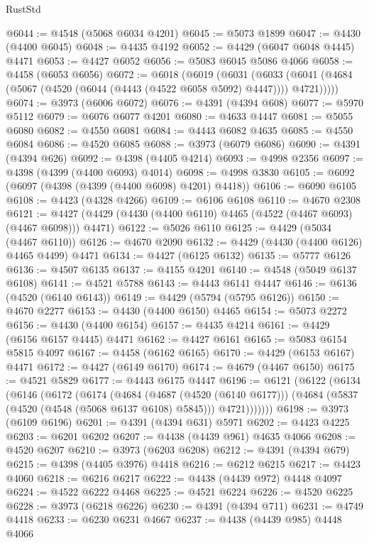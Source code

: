 \begin{lexlean}{RustStd}
\begin{coremodule}
{\begin{coremodule}
{{{{{{{{{{{{{{{{{{{{{{{{{{{{{{{{{{{{{{{{{{{{{{{{{{{{{{{{{{{{{{{{{{{{@6044 := @4548 (@5068 @6034 @4201)
@6045 := @5073 @1899
@6047 := @4430 (@4400 @6045)
@6048 := @4435 @4192
@6052 := @4429 (@6047 @6048 @4445) @4471
@6053 := @4427 @6052
@6056 := @5083 @6045 @5086 @4066
@6058 := @4458 (@6053 @6056)
@6072 := @6018
    (@6019
      (@6031
        (@6033 (@6041 (@4684 (@5067 (@4520 (@6044 (@4443 (@4522 @6058 @5092) @4447)))) @4721)))))
@6074 := @3973 (@6006 @6072)
@6076 := @4391 (@4394 @608)
@6077 := @5970 @5112
@6079 := @6076 @6077 @4201
@6080 := @4633 @4447
@6081 := @5055 @6080
@6082 := @4550 @6081
@6084 := @4443 @6082 @4635
@6085 := @4550 @6084
@6086 := @4520 @6085
@6088 := @3973 (@6079 @6086)
@6090 := @4391 (@4394 @626)
@6092 := @4398 (@4405 @4214)
@6093 := @4998 @2356
@6097 := @4398 (@4399 (@4400 @6093) @4014)
@6098 := @4998 @3830
@6105 := @6092 (@6097 (@4398 (@4399 (@4400 @6098) @4201) @4418))
@6106 := @6090 @6105
@6108 := @4423 (@4328 @4266)
@6109 := @6106 @6108
@6110 := @4670 @2308
@6121 := @4427 (@4429 (@4430 (@4400 @6110) @4465 (@4522 (@4467 @6093) (@4467 @6098))) @4471)
@6122 := @5026 @6110
@6125 := @4429 (@5034 (@4467 @6110))
@6126 := @4670 @2090
@6132 := @4429 (@4430 (@4400 @6126) @4465 @4499) @4471
@6134 := @4427 (@6125 @6132)
@6135 := @5777 @6126
@6136 := @4507 @6135
@6137 := @4155 @4201
@6140 := @4548 (@5049 @6137 @6108)
@6141 := @4521 @5788
@6143 := @4443 @6141 @4447
@6146 := @6136 (@4520 (@6140 @6143))
@6149 := @4429 (@5794 (@5795 @6126))
@6150 := @4670 @2277
@6153 := @4430 (@4400 @6150) @4465
@6154 := @5073 @2272
@6156 := @4430 (@4400 @6154)
@6157 := @4435 @4214
@6161 := @4429 (@6156 @6157 @4445) @4471
@6162 := @4427 @6161
@6165 := @5083 @6154 @5815 @4097
@6167 := @4458 (@6162 @6165)
@6170 := @4429 (@6153 @6167) @4471
@6172 := @4427 (@6149 @6170)
@6174 := @4679 (@4467 @6150)
@6175 := @4521 @5829
@6177 := @4443 @6175 @4447
@6196 := @6121
    (@6122
      (@6134
        (@6146
          (@6172
            (@6174
              (@4684
                (@4687 (@4520 (@6140 @6177)))
                (@4684 (@5837 (@4520 (@4548 (@5068 @6137 @6108) @5845))) @4721)))))))
@6198 := @3973 (@6109 @6196)
@6201 := @4391 (@4394 @631) @5971
@6202 := @4423 @4225
@6203 := @6201 @6202
@6207 := @4438 (@4439 @961) @4635 @4066
@6208 := @4520 @6207
@6210 := @3973 (@6203 @6208)
@6212 := @4391 (@4394 @679)
@6215 := @4398 (@4405 @3976) @4418
@6216 := @6212 @6215
@6217 := @4423 @4060
@6218 := @6216 @6217
@6222 := @4438 (@4439 @972) @4448 @4097
@6224 := @4522 @6222 @4468
@6225 := @4521 @6224
@6226 := @4520 @6225
@6228 := @3973 (@6218 @6226)
@6230 := @4391 (@4394 @711)
@6231 := @4749 @4418
@6233 := @6230 @6231 @4667
@6237 := @4438 (@4439 @985) @4448 @4066
}}}}}}}}}}}}}}}}}}}}}}}}}}}}}}}}}}}}}}}}}}}}}}}}}}}}}}}}}}}}}}}}}}}}
\end{coremodule}}
\end{coremodule}
\end{lexlean}
